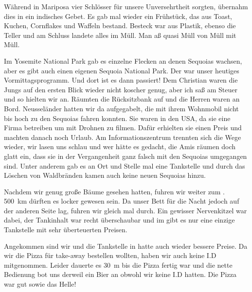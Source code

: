 Während in Mariposa vier Schlösser für unsere Unversehrtheit sorgten, übernahm dies in  ein indisches Gebet.
Es gab mal wieder ein Frühstück, das aus Toast, Kuchen, Cornflakes und Waffeln bestand.
Besteck war aus Plastik, ebenso die Teller und am Schluss landete alles im Müll.
Man aß quasi Müll von Müll mit Müll.

Im Yosemite National Park gab es einzelne Flecken an denen Sequoias wachsen, aber es gibt auch einen eigenen Sequoia National Park.
Der war unser heutiges Vormittagsprogramm.
Und dort ist es dann passiert!
Dem Christian waren die Jungs auf den ersten Blick wieder nicht koscher genug, aber ich saß am Steuer und so hielten wir an.
Räumten die Rücksitzbank auf und die Herren waren an Bord.
Neusseländer hatten wir da aufgegabelt, die mit ihrem Wohnmobil nicht bis hoch zu den Sequoias fahren konnten.
Sie waren in den USA, da sie eine Firma betreiben um mit Drohnen zu filmen.
Dafür erhielten sie einen Preis und machten danach noch Urlaub.
Am Informationszentrum trennten sich die Wege wieder, wir lasen uns schlau und wer hätte es gedacht, die Amis räumen doch glatt ein, dass sie in der Vergangenheit ganz falsch mit den Sequoias umgegangen sind.
Unter anderem gab es an Ort und Stelle mal eine Tankstelle und durch das Löschen von Waldbränden kamen auch keine neuen Sequoias hinzu.

\newpage
\thispagestyle{empty}
\newpage

Nachdem wir genug große Bäume gesehen hatten, fuhren wir weiter zum .
500~km dürften es locker gewesen sein.
Da unser Bett für die Nacht jedoch auf der anderen Seite lag, fuhren wir gleich mal durch.
Ein gewisser Nervenkitzel war dabei, der Tankinhalt war recht überschaubar und im  gibt es nur eine einzige Tankstelle mit sehr überteuerten Preisen.

Angekommen sind wir und die Tankstelle in  hatte auch wieder bessere Preise.
Da wir die Pizza für \glqq take-away \grqq bestellen wollten, haben wir auch keine I.D mitgenommen.
Leider dauerte es 30~m bis die Pizza fertig war und die nette Bedienung bot uns derweil ein Bier an obwohl wir keine I.D hatten.
Die Pizza war gut sowie das Helle!
